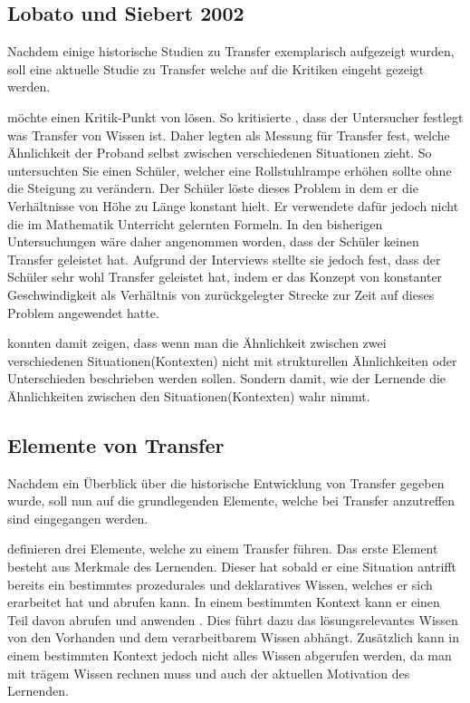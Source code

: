 \subsection{Lobato und Siebert 2002}



Nachdem einige historische Studien zu Transfer exemplarisch aufgezeigt wurden, soll eine aktuelle Studie zu Transfer welche auf die Kritiken eingeht gezeigt werden.


\citet{Lobato2002a} möchte einen Kritik-Punkt von \citet{Lave1988} lösen. So kritisierte \citeauthor{Lave1988}, dass der Untersucher festlegt was Transfer von Wissen ist. Daher legten \citet{Lobato2002a} als Messung für Transfer fest, welche Ähnlichkeit der Proband selbst zwischen verschiedenen Situationen zieht. So untersuchten Sie einen Schüler, welcher eine Rollstuhlrampe erhöhen sollte ohne die Steigung zu verändern. Der Schüler löste dieses Problem in dem er die Verhältnisse von Höhe zu Länge konstant hielt. Er verwendete dafür jedoch nicht die im Mathematik Unterricht gelernten Formeln. In den bisherigen Untersuchungen wäre daher angenommen worden, dass der Schüler keinen Transfer geleistet hat. Aufgrund der Interviews stellte sie jedoch fest, dass der Schüler sehr wohl Transfer geleistet hat, indem er das Konzept von konstanter Geschwindigkeit als Verhältnis von zurückgelegter Strecke zur Zeit auf dieses Problem angewendet hatte.

\citet{Lobato2002a} konnten damit zeigen, dass wenn man die Ähnlichkeit zwischen zwei verschiedenen Situationen(Kontexten) nicht mit strukturellen Ähnlichkeiten oder Unterschieden beschrieben werden sollen. Sondern damit, wie der Lernende die Ähnlichkeiten zwischen den Situationen(Kontexten) wahr nimmt.

\subsection{Elemente von Transfer}

Nachdem ein Überblick über die historische Entwicklung von Transfer gegeben wurde, soll nun auf die grundlegenden Elemente, welche bei Transfer anzutreffen sind eingegangen werden.

\citet{Marini1995} definieren drei Elemente, welche zu einem Transfer führen. Das erste Element besteht aus Merkmale des Lernenden. Dieser hat sobald er eine Situation antrifft bereits ein bestimmtes prozedurales und deklaratives Wissen, welches er sich erarbeitet hat und abrufen kann. In einem bestimmten Kontext kann er einen Teil davon abrufen und anwenden \citep[s. S. 189ff]{Marini1995}. Dies führt dazu das lösungsrelevantes Wissen von den Vorhanden und dem verarbeitbarem Wissen abhängt. Zusätzlich kann in einem bestimmten Kontext jedoch nicht alles Wissen abgerufen werden, da man mit trägem Wissen rechnen muss und auch der aktuellen Motivation des Lernenden. 

